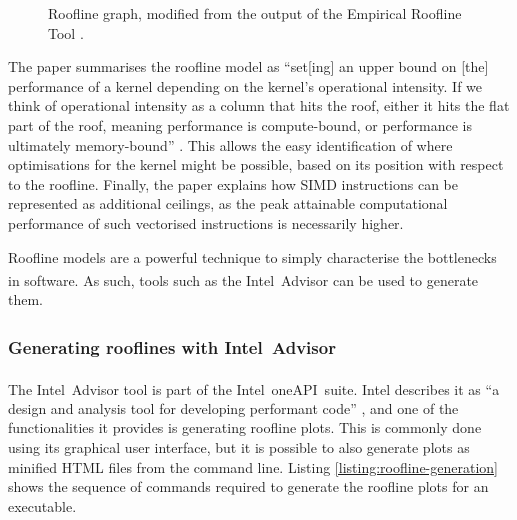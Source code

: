 \begin{figure}[H]
    \centering
    
    \vspace*{-0.5cm}
    \caption{Roofline graph, modified from the output of the Empirical Roofline Tool \cite{EmpiricalRooflineTool}.}
    \label{fig:ert-roofline}
\end{figure}

The paper summarises the roofline model as ``set[ing] an upper bound on [the] performance of a kernel depending on the kernel’s operational intensity. If we think of operational intensity as a column that hits the roof, either it hits the flat part of the roof, meaning performance is compute-bound, or performance is ultimately memory-bound'' \cite{williamsRooflineInsightfulVisual2009}. This allows the easy identification of where optimisations for the kernel might be possible, based on its position with respect to the roofline. Finally, the paper explains how \acrfull{SIMD} instructions can be represented as additional ceilings, as the peak attainable computational performance of such vectorised instructions is necessarily higher.


Roofline models are a powerful technique to simply characterise the bottlenecks in software. As such, tools such as the Intel\textsuperscript{\textregistered}\ Advisor can be used to generate them.

\subsubsection{Generating rooflines with Intel\textsuperscript{\textregistered}\ Advisor}
\label{sssec:roofline-generation-intel-advisor}

The Intel\textsuperscript{\textregistered}\ Advisor tool is part of the Intel\textsuperscript{\textregistered}\ oneAPI\texttrademark\ suite. Intel describes it as ``a design and analysis tool for developing performant code'' \cite{DesignCodeParallelism}, and one of the functionalities it provides is generating roofline plots. This is commonly done using its graphical user interface, but it is possible to also generate plots as minified HTML files from the command line. Listing \ref{listing:roofline-generation} shows the sequence of commands required to generate the roofline plots for an executable. 

